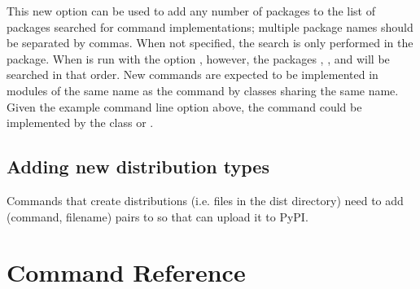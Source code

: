 \documentclass{manual}
\begin{document}
This new option can be used to add any number of packages to the list
of packages searched for command implementations; multiple package
names should be separated by commas.  When not specified, the search
is only performed in the  package.  When
 is run with the option
 ,
however, the packages , ,
and  will be searched in that order.  New commands
are expected to be implemented in modules of the same name as the
command by classes sharing the same name.  Given the example command
line option above, the command  could be
implemented by the class 
or .

\section{Adding new distribution types}

Commands that create distributions (i.e. files in the dist directory)
need to add (command, filename) pairs to 
so that  can upload it to PyPI.

\chapter{Command Reference}
\label{reference}





\end{document}
